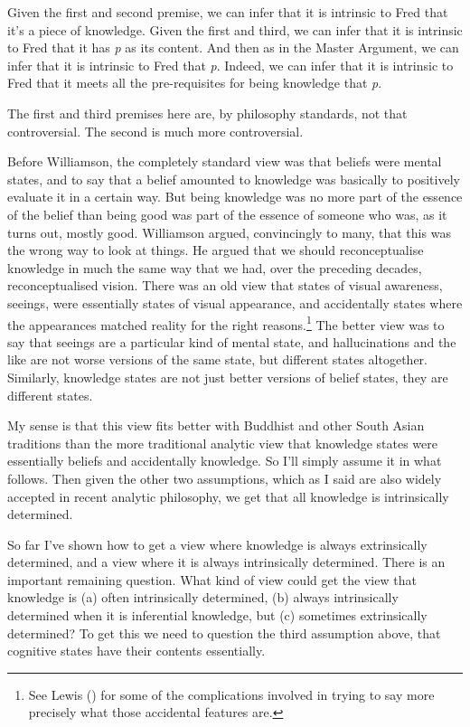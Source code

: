\documentclass[
  10pt,
  letterpaper,
  DIV=11,
  numbers=noendperiod,
  twoside]{scrartcl}
\begin{document}
Given the first and second premise, we can infer that it is intrinsic to
Fred that it's a piece of knowledge. Given the first and third, we can
infer that it is intrinsic to Fred that it has \emph{p} as its content.
And then as in the Master Argument, we can infer that it is intrinsic to
Fred that \emph{p}. Indeed, we can infer that it is intrinsic to Fred
that it meets all the pre-requisites for being knowledge that \emph{p}.

The first and third premises here are, by philosophy standards, not that
controversial. The second is much more controversial.

Before Williamson, the completely standard view was that beliefs were
mental states, and to say that a belief amounted to knowledge was
basically to positively evaluate it in a certain way. But being
knowledge was no more part of the essence of the belief than being good
was part of the essence of someone who was, as it turns out, mostly
good. Williamson argued, convincingly to many, that this was the wrong
way to look at things. He argued that we should reconceptualise
knowledge in much the same way that we had, over the preceding decades,
reconceptualised vision. There was an old view that states of visual
awareness, seeings, were essentially states of visual appearance, and
accidentally states where the appearances matched reality for the right
reasons.\footnote{See Lewis () for some
  of the complications involved in trying to say more precisely what
  those accidental features are.} The better view was to say that
seeings are a particular kind of mental state, and hallucinations and
the like are not worse versions of the same state, but different states
altogether. Similarly, knowledge states are not just better versions of
belief states, they are different states.

My sense is that this view fits better with Buddhist and other South
Asian traditions than the more traditional analytic view that knowledge
states were essentially beliefs and accidentally knowledge. So I'll
simply assume it in what follows. Then given the other two assumptions,
which as I said are also widely accepted in recent analytic philosophy,
we get that all knowledge is intrinsically determined.

So far I've shown how to get a view where knowledge is always
extrinsically determined, and a view where it is always intrinsically
determined. There is an important remaining question. What kind of view
could get the view that knowledge is (a) often intrinsically determined,
(b) always intrinsically determined when it is inferential knowledge,
but (c) sometimes extrinsically determined? To get this we need to
question the third assumption above, that cognitive states have their
contents essentially.
\end{document}
